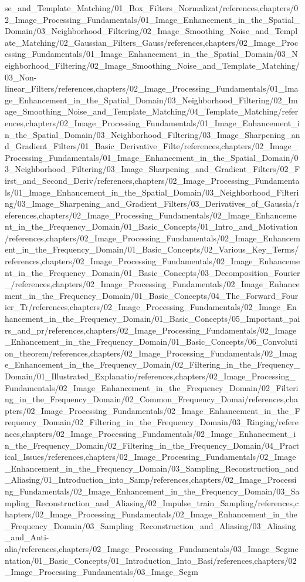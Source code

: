se_and_Template_Matching/01_Box_Filters_Normalizat/references,chapters/02_Image_Processing_Fundamentals/01_Image_Enhancement_in_the_Spatial_Domain/03_Neighborhood_Filtering/02_Image_Smoothing_Noise_and_Template_Matching/02_Gaussian_Filters_Gauss/references,chapters/02_Image_Processing_Fundamentals/01_Image_Enhancement_in_the_Spatial_Domain/03_Neighborhood_Filtering/02_Image_Smoothing_Noise_and_Template_Matching/03_Non-linear_Filters/references,chapters/02_Image_Processing_Fundamentals/01_Image_Enhancement_in_the_Spatial_Domain/03_Neighborhood_Filtering/02_Image_Smoothing_Noise_and_Template_Matching/04_Template_Matching/references,chapters/02_Image_Processing_Fundamentals/01_Image_Enhancement_in_the_Spatial_Domain/03_Neighborhood_Filtering/03_Image_Sharpening_and_Gradient_Filters/01_Basic_Derivative_Filte/references,chapters/02_Image_Processing_Fundamentals/01_Image_Enhancement_in_the_Spatial_Domain/03_Neighborhood_Filtering/03_Image_Sharpening_and_Gradient_Filters/02_First_and_Second_Deriv/references,chapters/02_Image_Processing_Fundamentals/01_Image_Enhancement_in_the_Spatial_Domain/03_Neighborhood_Filtering/03_Image_Sharpening_and_Gradient_Filters/03_Derivatives_of_Gaussia/references,chapters/02_Image_Processing_Fundamentals/02_Image_Enhancement_in_the_Frequency_Domain/01_Basic_Concepts/01_Intro_and_Motivation/references,chapters/02_Image_Processing_Fundamentals/02_Image_Enhancement_in_the_Frequency_Domain/01_Basic_Concepts/02_Various_Key_Terms/references,chapters/02_Image_Processing_Fundamentals/02_Image_Enhancement_in_the_Frequency_Domain/01_Basic_Concepts/03_Decomposition_Fourier_/references,chapters/02_Image_Processing_Fundamentals/02_Image_Enhancement_in_the_Frequency_Domain/01_Basic_Concepts/04_The_Forward_Fourier_Tr/references,chapters/02_Image_Processing_Fundamentals/02_Image_Enhancement_in_the_Frequency_Domain/01_Basic_Concepts/05_Important_pairs_and_pr/references,chapters/02_Image_Processing_Fundamentals/02_Image_Enhancement_in_the_Frequency_Domain/01_Basic_Concepts/06_Convolution_theorem/references,chapters/02_Image_Processing_Fundamentals/02_Image_Enhancement_in_the_Frequency_Domain/02_Filtering_in_the_Frequency_Domain/01_Illustrated_Explanatio/references,chapters/02_Image_Processing_Fundamentals/02_Image_Enhancement_in_the_Frequency_Domain/02_Filtering_in_the_Frequency_Domain/02_Common_Frequency_Domai/references,chapters/02_Image_Processing_Fundamentals/02_Image_Enhancement_in_the_Frequency_Domain/02_Filtering_in_the_Frequency_Domain/03_Ringing/references,chapters/02_Image_Processing_Fundamentals/02_Image_Enhancement_in_the_Frequency_Domain/02_Filtering_in_the_Frequency_Domain/04_Practical_Issues/references,chapters/02_Image_Processing_Fundamentals/02_Image_Enhancement_in_the_Frequency_Domain/03_Sampling_Reconstruction_and_Aliasing/01_Introduction_into_Samp/references,chapters/02_Image_Processing_Fundamentals/02_Image_Enhancement_in_the_Frequency_Domain/03_Sampling_Reconstruction_and_Aliasing/02_Impulse_train_Sampling/references,chapters/02_Image_Processing_Fundamentals/02_Image_Enhancement_in_the_Frequency_Domain/03_Sampling_Reconstruction_and_Aliasing/03_Aliasing_and_Anti-alia/references,chapters/02_Image_Processing_Fundamentals/03_Image_Segmentation/01_Basic_Concepts/01_Introduction_Into_Basi/references,chapters/02_Image_Processing_Fundamentals/03_Image_Segm